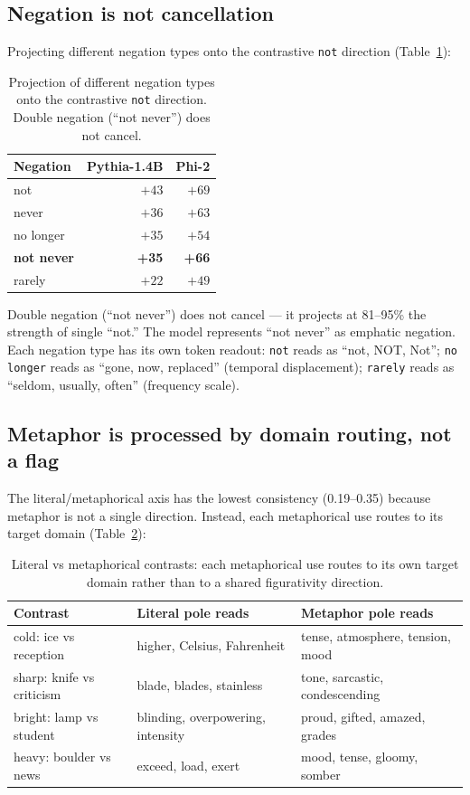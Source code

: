 \documentclass[11pt]{article}
\begin{document}
\subsection{Negation is not cancellation}

Projecting different negation types onto the contrastive \texttt{not} direction (Table~\ref{tab:negation}):

\begin{table}[htbp]
\centering
\small
\begin{tabular}{lrr}
\toprule
Negation & Pythia-1.4B & Phi-2 \\
\midrule
not & $+43$ & $+69$ \\
never & $+36$ & $+63$ \\
no longer & $+35$ & $+54$ \\
\textbf{not never} & \textbf{+35} & \textbf{+66} \\
rarely & $+22$ & $+49$ \\
\bottomrule
\end{tabular}
\caption{Projection of different negation types onto the contrastive \texttt{not} direction. Double negation (``not never'') does not cancel.}
\label{tab:negation}
\end{table}

Double negation (``not never'') does not cancel --- it projects at 81--95\% the
strength of single ``not.'' The model represents ``not never'' as emphatic
negation. Each negation type has its own token readout: \texttt{not} reads as
``not, NOT, Not''; \texttt{no longer} reads as ``gone, now, replaced'' (temporal
displacement); \texttt{rarely} reads as ``seldom, usually, often'' (frequency scale).

\subsection{Metaphor is processed by domain routing, not a flag}

The literal/metaphorical axis has the lowest consistency (0.19--0.35) because
metaphor is not a single direction. Instead, each metaphorical use routes to
its target domain (Table~\ref{tab:metaphor}):

\begin{table}[htbp]
\centering
\small
\begin{tabular}{lll}
\toprule
Contrast & Literal pole reads & Metaphor pole reads \\
\midrule
cold: ice vs reception & higher, Celsius, Fahrenheit & tense, atmosphere, tension, mood \\
sharp: knife vs criticism & blade, blades, stainless & tone, sarcastic, condescending \\
bright: lamp vs student & blinding, overpowering, intensity & proud, gifted, amazed, grades \\
heavy: boulder vs news & exceed, load, exert & mood, tense, gloomy, somber \\
\bottomrule
\end{tabular}
\caption{Literal vs metaphorical contrasts: each metaphorical use routes to its own target domain rather than to a shared figurativity direction.}
\label{tab:metaphor}
\end{table}
\end{document}
